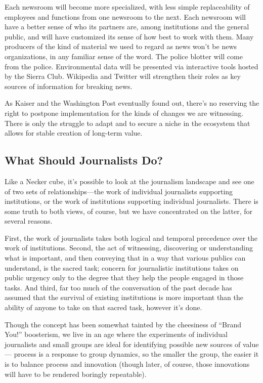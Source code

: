 Each newsroom will become more specialized, with less simple replaceability of
employees and functions from one newsroom to the next. Each newsroom will
have a better sense of who its partners are, among institutions and the general
public, and will have customized its sense of how best to work with them. Many
producers of the kind of material we used to regard as news won’t be news organizations,
in any familiar sense of the word. The police blotter will come from
the police. Environmental data will be presented via interactive tools hosted by
the Sierra Club. Wikipedia and Twitter will strengthen their roles as key sources
of information for breaking news.

As Kaiser and the Washington Post eventually found out, there’s no reserving the
right to postpone implementation for the kinds of changes we are witnessing.
There is only the struggle to adapt and to secure a niche in the ecosystem that
allows for stable creation of long-term value.

\subsection{What Should Journalists Do?}
Like a Necker cube, it’s possible to look at the journalism landscape and see
one of two sets of relationships—the work of individual journalists supporting
institutions, or the work of institutions supporting individual journalists. There
is some truth to both views, of course, but we have concentrated on the latter,
for several reasons.

First, the work of journalists takes both logical and temporal precedence over the
work of institutions. Second, the act of witnessing, discovering or understanding
what is important, and then conveying that in a way that various publics can
understand, is the sacred task; concern for journalistic institutions takes on public urgency only to the degree that they help the people engaged in those tasks. And
third, far too much of the conversation of the past decade has assumed that the
survival of existing institutions is more important than the ability of anyone to
take on that sacred task, however it’s done.

Though the concept has been somewhat tainted by the cheesiness of ``Brand
You!'' boosterism, we live in an age where the experiments of individual journalists
and small groups are ideal for identifying possible new sources of value—
process is a response to group dynamics, so the smaller the group, the easier it is
to balance process and innovation (though later, of course, those innovations will
have to be rendered boringly repeatable).

